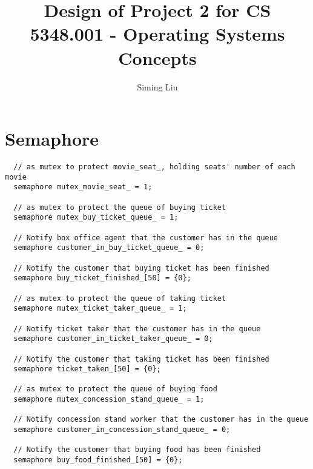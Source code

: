\documentclass[a4paper]{report}
\begin{document}
\title{Design of Project 2 for CS 5348.001 - Operating Systems Concepts}

\author{Siming Liu}

\maketitle{}

\section*{Semaphore}
\begin{lstlisting}
  // as mutex to protect movie_seat_, holding seats' number of each movie
  semaphore mutex_movie_seat_ = 1;

  // as mutex to protect the queue of buying ticket
  semaphore mutex_buy_ticket_queue_ = 1;

  // Notify box office agent that the customer has in the queue
  semaphore customer_in_buy_ticket_queue_ = 0;

  // Notify the customer that buying ticket has been finished
  semaphore buy_ticket_finished_[50] = {0};

  // as mutex to protect the queue of taking ticket
  semaphore mutex_ticket_taker_queue_ = 1;

  // Notify ticket taker that the customer has in the queue
  semaphore customer_in_ticket_taker_queue_ = 0;

  // Notify the customer that taking ticket has been finished
  semaphore ticket_taken_[50] = {0};

  // as mutex to protect the queue of buying food
  semaphore mutex_concession_stand_queue_ = 1;

  // Notify concession stand worker that the customer has in the queue
  semaphore customer_in_concession_stand_queue_ = 0;

  // Notify the customer that buying food has been finished
  semaphore buy_food_finished_[50] = {0};
\end{lstlisting}
\end{document}
